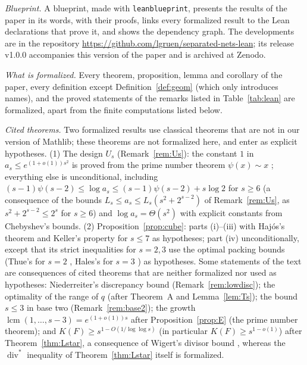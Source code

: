 \documentclass[11pt]{amsart}
\theoremstyle{definition}
\theoremstyle{plain}
\begin{document}
\emph{Blueprint.} A blueprint, made with \texttt{leanblueprint}, presents the results of the paper in its words, with their proofs, links every formalized result to the Lean declarations that prove it, and shows the dependency graph. The developments are in the repository \url{https://github.com/lgruen/separated-nets-lean}; its release v1.0.0 accompanies this version of the paper and is archived at Zenodo.

\emph{What is formalized.} Every theorem, proposition, lemma and corollary of the paper, every definition except Definition~\ref{def:geom} (which only introduces names), and the proved statements of the remarks listed in Table~\ref{tab:lean} are formalized, apart from the finite computations listed below.

\emph{Cited theorems.} Two formalized results use classical theorems that are not in our version of Mathlib; these theorems are not formalized here, and enter as explicit hypotheses. (1) The design $U_s$ (Remark~\ref{rem:Us}): the constant $1$ in $a_s\le e^{(1+o(1))s^2}$ is proved from the prime number theorem $\psi(x)\sim x$ \cite{Had96,dlVP96}; everything else is unconditional, including $(s-1)\psi(s-2)\le\log a_s\le(s-1)\psi(s-2)+s\log2$ for $s\ge6$ (a consequence of the bounds $L_s\le a_s\le L_s(s^2+2^{s-2})$ of Remark~\ref{rem:Us}, as $s^2+2^{s-2}\le2^s$ for $s\ge6$) and $\log a_s=\Theta(s^2)$ with explicit constants from Chebyshev's bounds. (2) Proposition~\ref{prop:cube}: parts (i)--(iii) with Haj\'os's theorem \cite{Haj42} and Keller's property for $s\le7$ \cite{Per40,BHMN20} as hypotheses; part (iv) unconditionally, except that its strict inequalities for $s=2,3$ use the optimal packing bounds (Thue's for $s=2$ \cite[Ch.~1]{CS99}, Hales's for $s=3$ \cite{Hal05}) as hypotheses. Some statements of the text are consequences of cited theorems that are neither formalized nor used as hypotheses: Niederreiter's discrepancy bound \cite{Nie87} (Remark~\ref{rem:lowdisc}); the optimality of the range of $q$ \cite[Cor.~2]{LNS96} (after Theorem~A and Lemma~\ref{lem:Ts}); the bound $s\le3$ in base two \cite[Cor.~5.11]{Nie87} (Remark~\ref{rem:base2}); the growth $\operatorname{lcm}(1,\dots,s-3)=e^{(1+o(1))s}$ after Proposition~\ref{prop:E} (the prime number theorem); and $K(F)\ge s^{1-O(1/\log\log s)}$ (in particular $K(F)\ge s^{1-o(1)}$) after Theorem~\ref{thm:Lstar}, a consequence of Wigert's divisor bound \cite[Thm.~317]{HW08}, whereas the $\operatorname{div}^*$ inequality of Theorem~\ref{thm:Lstar} itself is formalized.
\end{document}
